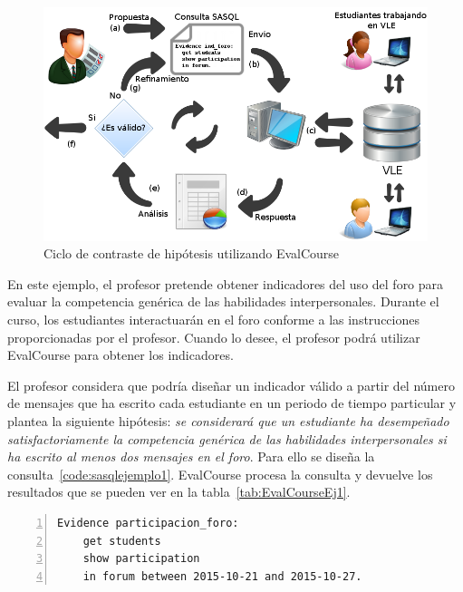 \begin{figure}
  \begin{center}
    \includegraphics[scale=0.45]{EvcDiagram.png}
  \end{center}
  \caption{Ciclo de contraste de hipótesis utilizando EvalCourse}
  \label{fig:EVCDiagram}
\end{figure}

			En este ejemplo, el profesor pretende obtener indicadores del uso del foro para evaluar la competencia genérica de las habilidades interpersonales. Durante el curso, los estudiantes interactuarán en el foro conforme a las instrucciones proporcionadas por el profesor. Cuando lo desee, el profesor podrá utilizar EvalCourse para obtener los indicadores.


			El profesor considera que podría diseñar un indicador válido a partir del número de mensajes que ha escrito cada estudiante en un periodo de tiempo particular y plantea la siguiente hipótesis: \emph{se considerará que un estudiante ha desempeñado satisfactoriamente la competencia genérica de las habilidades interpersonales si ha escrito al menos dos mensajes en el foro}. Para ello se diseña la consulta~\ref{code:sasqlejemplo1}. EvalCourse procesa la consulta y devuelve los resultados que se pueden ver en la tabla~\ref{tab:EvalCourseEj1}.

\begin{lstlisting}[caption=Participación en el foro en un periodo concreto de tiempo ,label=code:sasqlejemplo1,numbers=left, captionpos=b, morekeywords={Evidence,get, students, show, milestones, participation, access, in, assignment, forum, campus, workshop, interaction, between, and}]
Evidence participacion_foro: 
	get students
	show participation
	in forum between 2015-10-21 and 2015-10-27.
\end{lstlisting}


